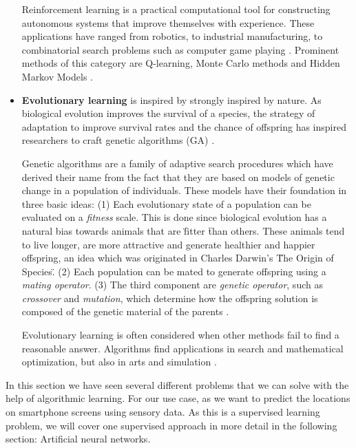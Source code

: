 \begin{itemize}
 Reinforcement learning is a practical computational tool for constructing autonomous systems that improve themselves with experience. These applications have ranged from robotics, to industrial manufacturing, to combinatorial search problems such
as computer game playing \cite{kaelbling1996reinforcement}. 
Prominent methods of this category are Q-learning, Monte Carlo
methods and Hidden Markov Models \cite{Marsland:2009:MLA:1571643}.\\

  \item[] \textbf{Evolutionary learning} is inspired by strongly inspired by nature. As biological evolution improves the survival of a species, the strategy of adaptation to improve survival rates and the chance of offspring has inspired researchers to craft genetic algorithms (GA) \cite{Marsland:2009:MLA:1571643}. 

Genetic algorithms are a family of adaptive search procedures which have derived their name from the fact that they are based on models of genetic change in a population of individuals. These models have their foundation in three basic ideas: (1) Each evolutionary state of a population can be evaluated on a \textit{fitness} scale. This is done since biological evolution has a natural bias towards animals that are \" fitter \" than others. These animals tend to live longer, are more attractive and generate healthier and happier offspring, an idea which was originated in Charles Darwin's \"The Origin of Species\". (2) Each population can be mated to generate offspring using a \textit{mating operator}. (3) The third component are \textit{genetic operator}, such as \textit{crossover} and \textit{mutation}, which determine how the offspring solution is composed of the genetic material of the parents \cite{de1988learning}.

Evolutionary learning is often considered when other methods fail to find a reasonable answer. Algorithms find applications in search and mathematical optimization, but also in arts and simulation \cite{Marsland:2009:MLA:1571643}.\\
\end{itemize}

In this section we have seen several different problems that we can solve with the help of algorithmic learning. For our use case, as we want to predict the locations on smartphone screens using sensory data. As this is a supervised learning problem, we will cover one supervised approach in more detail in the following section: Artificial neural networks.


